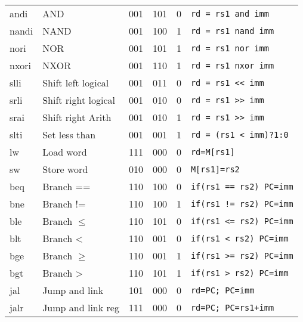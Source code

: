 \documentclass[a4paper]{article}
\begin{document}
\begin{tabular}{|l|l|c|c|c|l|}
        andi  & AND                  & 001    & 101    & 0      & \texttt{rd = rs1 and imm}   \\
        nandi & NAND                 & 001    & 100    & 1      & \texttt{rd = rs1 nand imm}    \\
        nori  & NOR                  & 001    & 101    & 1      & \texttt{rd = rs1 nor imm}     \\
        nxori & NXOR                 & 001    & 110    & 1      & \texttt{rd = rs1 nxor imm}    \\
        slli  & Shift left logical   & 001    & 011    & 0      & \texttt{rd = rs1 << imm}      \\
        srli  & Shift right logical  & 001    & 010    & 0      & \texttt{rd = rs1 >> imm}      \\
        srai  & Shift right Arith    & 001    & 010    & 1      & \texttt{rd = rs1 >> imm}      \\
        slti  & Set less than        & 001    & 001    & 1      & \texttt{rd = (rs1 < imm)?1:0} \\
        \hline
        lw    & Load word            & 111    & 000    & 0      & \texttt{rd=M[rs1]}            \\
        sw    & Store word           & 010    & 000    & 0      & \texttt{M[rs1]=rs2}           \\
        \hline
        beq   & Branch ==            & 110    & 100    & 0      & \texttt{if(rs1 == rs2) PC=imm}\\
        bne   & Branch !=            & 110    & 100    & 1      & \texttt{if(rs1 != rs2) PC=imm}\\
        ble   & Branch \(\leqslant\) & 110    & 101    & 0      & \texttt{if(rs1 <= rs2) PC=imm}\\
        blt   & Branch <             & 110    & 001    & 0      & \texttt{if(rs1 < rs2) PC=imm} \\
        bge   & Branch \(\geqslant\) & 110    & 001    & 1      & \texttt{if(rs1 >= rs2) PC=imm}\\
        bgt   & Branch >             & 110    & 101    & 1      & \texttt{if(rs1 > rs2) PC=imm} \\

        \hline
        jal  & Jump and link        & 101    & 000    & 0      &\texttt{rd=PC; PC=imm}         \\
        jalr & Jump and link reg    & 111    & 000    & 0      &\texttt{rd=PC; PC=rs1+imm}     \\
        \hline
    \end{tabular}
    
\end{document}
